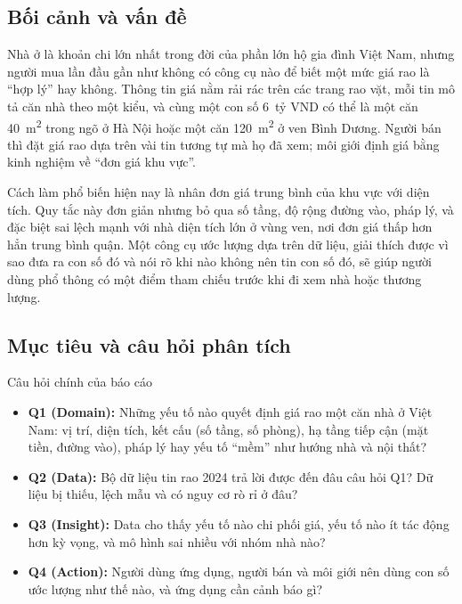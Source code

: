\documentclass[11pt]{article}
\newcommand{\ty}{tỷ VND}
\newcommand{\mtwo}{m\textsuperscript{2}}
\begin{document}
\subsection{Bối cảnh và vấn đề}

Nhà ở là khoản chi lớn nhất trong đời của phần lớn hộ gia đình Việt Nam, nhưng người mua lần đầu
gần như không có công cụ nào để biết một mức giá rao là ``hợp lý'' hay không. Thông tin giá nằm rải
rác trên các trang rao vặt, mỗi tin mô tả căn nhà theo một kiểu, và cùng một con số 6~\ty{} có thể là
một căn 40~\mtwo{} trong ngõ ở Hà Nội hoặc một căn 120~\mtwo{} ở ven Bình Dương. Người bán thì đặt giá
rao dựa trên vài tin tương tự mà họ đã xem; môi giới định giá bằng kinh nghiệm về ``đơn giá khu vực''.

Cách làm phổ biến hiện nay là nhân đơn giá trung bình của khu vực với diện tích. Quy tắc này đơn giản
nhưng bỏ qua số tầng, độ rộng đường vào, pháp lý, và đặc biệt sai lệch mạnh với nhà diện tích lớn ở
vùng ven, nơi đơn giá thấp hơn hẳn trung bình quận. Một công cụ ước lượng dựa trên dữ liệu, giải thích
được vì sao đưa ra con số đó và nói rõ khi nào không nên tin con số đó, sẽ giúp người dùng phổ thông có
một điểm tham chiếu trước khi đi xem nhà hoặc thương lượng.

\subsection{Mục tiêu và câu hỏi phân tích}

\begin{mainbox}{Câu hỏi chính của báo cáo}
\begin{itemize}
    \item \textbf{Q1 (Domain):} Những yếu tố nào quyết định giá rao một căn nhà ở Việt Nam: vị trí,
          diện tích, kết cấu (số tầng, số phòng), hạ tầng tiếp cận (mặt tiền, đường vào), pháp lý hay
          yếu tố ``mềm'' như hướng nhà và nội thất?
    \item \textbf{Q2 (Data):} Bộ dữ liệu tin rao 2024 trả lời được đến đâu câu hỏi Q1? Dữ liệu bị
          thiếu, lệch mẫu và có nguy cơ rò rỉ ở đâu?
    \item \textbf{Q3 (Insight):} Data cho thấy yếu tố nào chi phối giá, yếu tố nào ít tác động hơn
          kỳ vọng, và mô hình sai nhiều với nhóm nhà nào?
    \item \textbf{Q4 (Action):} Người dùng ứng dụng, người bán và môi giới nên dùng con số ước lượng
          như thế nào, và ứng dụng cần cảnh báo gì?
\end{itemize}
\end{mainbox}
\end{document}
